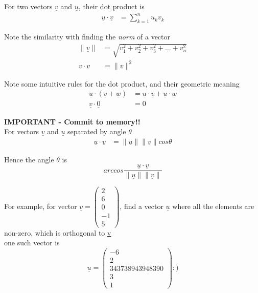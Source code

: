 \begin{framed}
   For two vectors $ \underline{v}$ and $ \underline{u}$, their dot product is
   \begin{align*}
      \underline{u} \cdot \underline{v} &= \sum_{k = 1}^{n} u_k v_k
   \end{align*}

   Note the similarity with finding the \emph{norm} of a vector
   \begin{align*}
      \lVert \underline{v} \rVert  &= \sqrt{v_1^2 + v_2^2 + v_3^2 + \hdots + v_n^2} \\
      \underline{v} \cdot \underline{v} &= \lVert \underline{v} \rVert^2
   \end{align*}

   Note some intuitive rules for the dot product, and their geometric meaning
   \begin{align*}
      \underline{u} \cdot ( \underline{v} + \underline{w}) &= \underline{u} \cdot \underline{v} + \underline{u} \cdot \underline{w} \\
      \underline{v} \cdot \underline{0} &= 0
   \end{align*}

   \textbf{IMPORTANT - Commit to memory!!} \\
   For vectors $ \underline{v}$ and $ \underline{u}$ separated by angle $ \theta$
   \begin{align*}
      \underline{u} \cdot \underline{v} &= \lVert \underline{u} \rVert  \lVert \underline{v} \rVert cos \theta
   \end{align*}

   Hence the angle $ \theta $ is  \[
     arccos \frac{ \underline{u} \cdot \underline{v}}{ \lVert \underline{u} \rVert \lVert \underline{v} \rVert }
   \] 


   For example, for vector $ \underline{v} = \begin{pmatrix} 2 \\ 6 \\0\\-1\\5 \end{pmatrix}$, find a vector $ \underline{u}$ where all the elements are non-zero, which is orthogonal to \underline{v} \\

   one such vector is \[
     \underline{u} = \begin{pmatrix} 
       -6 \\ 2 \\ 343738943948390 \\ 3 \\ 1  
     \end{pmatrix}
     :)
   \] 

\end{framed}

